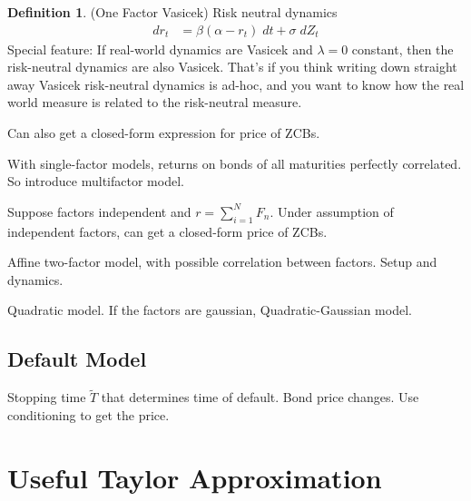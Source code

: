 \documentclass[12pt]{article}
\theoremstyle{plain}
\theoremstyle{definition}
\newtheorem{defn}[thm]{Definition}
\theoremstyle{remark}
\newcommand{\sumiN}{\sum^N_{i=1}}
\begin{document}
\begin{defn}(One Factor Vasicek)
Risk neutral dynamics
\begin{align*}
  dr_t
  &=
  \beta(\alpha-r_t)\;dt
  +
  \sigma\;dZ_t
\end{align*}
Special feature: If real-world dynamics are Vasicek and $\lambda=0$
constant, then the risk-neutral dynamics are also Vasicek. That's if you
think writing down straight away Vasicek risk-neutral dynamics is
ad-hoc, and you want to know how the real world measure is related to
the risk-neutral measure.

Can also get a closed-form expression for price of ZCBs.
\end{defn}

With single-factor models, returns on bonds of all maturities perfectly
correlated.
So introduce multifactor model.

Suppose factors independent and $r=\sumiN F_n$. Under assumption of
independent factors, can get a closed-form price of ZCBs.

Affine two-factor model, with possible correlation between factors.
Setup and dynamics.

Quadratic model. If the factors are gaussian, Quadratic-Gaussian model.


\clearpage
\subsection{Default Model}

Stopping time $\tilde{T}$ that determines time of default.
Bond price changes. Use conditioning to get the price.















\newpage
\appendix

\clearpage
\section{Useful Taylor Approximation}
\end{document}
